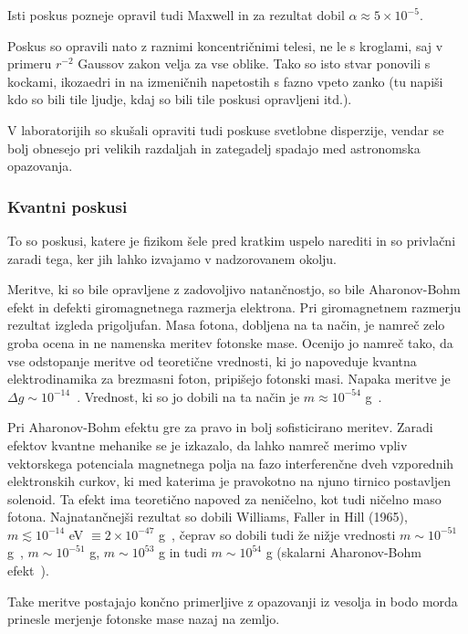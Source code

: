 \documentclass[a4paper, twocolumn, titlepage]{article}
\begin{document}
Isti poskus pozneje opravil tudi Maxwell in za rezultat dobil $\alpha \approx 5 \times 10^{-5}$.

Poskus so opravili nato z raznimi koncentričnimi telesi, ne le s kroglami, saj v primeru $r^{-2}$ Gaussov zakon velja za vse oblike.
Tako so isto stvar ponovili s kockami, ikozaedri in na izmeničnih napetostih s fazno vpeto zanko (tu napiši kdo so bili tile
ljudje, kdaj so bili tile poskusi opravljeni itd.).

V laboratorijih so skušali opraviti tudi poskuse svetlobne disperzije, vendar se bolj obnesejo pri velikih razdaljah in zategadelj spadajo
med astronomska opazovanja.

\subsubsection{Kvantni poskusi}

To so poskusi, katere je fizikom šele pred kratkim uspelo narediti in so privlačni zaradi tega, ker jih lahko izvajamo v nadzorovanem okolju.

Meritve, ki so bile opravljene z zadovoljivo natančnostjo, so bile Aharonov-Bohm efekt in defekti giromagnetnega razmerja elektrona.
Pri giromagnetnem razmerju rezultat izgleda prigoljufan. Masa fotona, dobljena na ta način, je namreč zelo groba ocena in ne namenska meritev
fotonske mase. Ocenijo jo namreč tako, da vse odstopanje meritve od teoretične vrednosti, ki jo napoveduje kvantna elektrodinamika za
brezmasni foton, pripišejo fotonski masi. Napaka meritve je $\Delta g \sim 10^{-14}$~\cite{over}. Vrednost, ki so jo dobili na ta način je
$m \approx 10^{-54}$ g~\cite{over}.

Pri Aharonov-Bohm efektu gre za pravo in bolj sofisticirano meritev. Zaradi efektov kvantne mehanike se je izkazalo, da lahko namreč merimo
vpliv vektorskega potenciala magnetnega polja na fazo interferenčne dveh vzporednih elektronskih curkov, ki med katerima je pravokotno na njuno
tirnico postavljen solenoid. Ta efekt ima teoretično napoved za
neničelno, kot tudi ničelno maso fotona. Najnatančnejši rezultat so dobili Williams, Faller in Hill (1965),
$m \lesssim 10^{-14}$ eV $\equiv 2\times 10^{-47}$ g~\cite{nieto2}, čeprav so dobili tudi že nižje vrednosti $m \sim 10^{-51}$ g~\cite{over},
$m \sim 10^{-51}$ g, $m \sim 10^{53}$ g in tudi $m \sim 10^{54}$ g (skalarni Aharonov-Bohm efekt~\cite{over}).

Take meritve postajajo končno primerljive z opazovanji iz vesolja in
bodo morda prinesle merjenje fotonske mase nazaj na zemljo.
\end{document}
